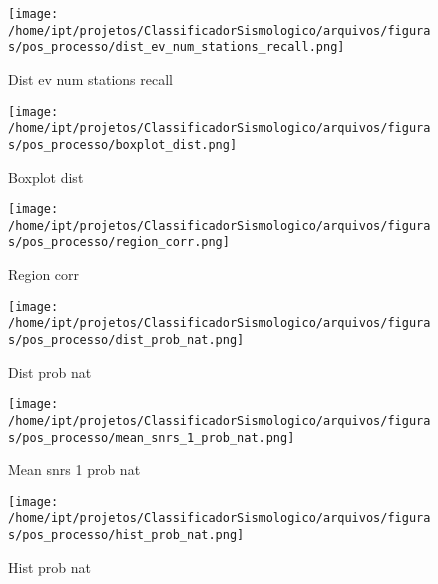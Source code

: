                     \begin{figure}[H]
                        \centering
                        \texttt{[image: /home/ipt/projetos/ClassificadorSismologico/arquivos/figuras/pos\_processo/dist\_ev\_num\_stations\_recall.png]}
                        \caption{Dist ev num stations recall}
                        \label{fig:dist_ev_num_stations_recall}
                    \end{figure}
                

                    \begin{figure}[H]
                        \centering
                        \texttt{[image: /home/ipt/projetos/ClassificadorSismologico/arquivos/figuras/pos\_processo/boxplot\_dist.png]}
                        \caption{Boxplot dist}
                        \label{fig:boxplot_dist}
                    \end{figure}
                

                    \begin{figure}[H]
                        \centering
                        \texttt{[image: /home/ipt/projetos/ClassificadorSismologico/arquivos/figuras/pos\_processo/region\_corr.png]}
                        \caption{Region corr}
                        \label{fig:region_corr}
                    \end{figure}
                

                    \begin{figure}[H]
                        \centering
                        \texttt{[image: /home/ipt/projetos/ClassificadorSismologico/arquivos/figuras/pos\_processo/dist\_prob\_nat.png]}
                        \caption{Dist prob nat}
                        \label{fig:dist_prob_nat}
                    \end{figure}
                

                    \begin{figure}[H]
                        \centering
                        \texttt{[image: /home/ipt/projetos/ClassificadorSismologico/arquivos/figuras/pos\_processo/mean\_snrs\_1\_prob\_nat.png]}
                        \caption{Mean snrs 1 prob nat}
                        \label{fig:mean_snrs_1_prob_nat}
                    \end{figure}
                

                    \begin{figure}[H]
                        \centering
                        \texttt{[image: /home/ipt/projetos/ClassificadorSismologico/arquivos/figuras/pos\_processo/hist\_prob\_nat.png]}
                        \caption{Hist prob nat}
                        \label{fig:hist_prob_nat}
                    \end{figure}
                